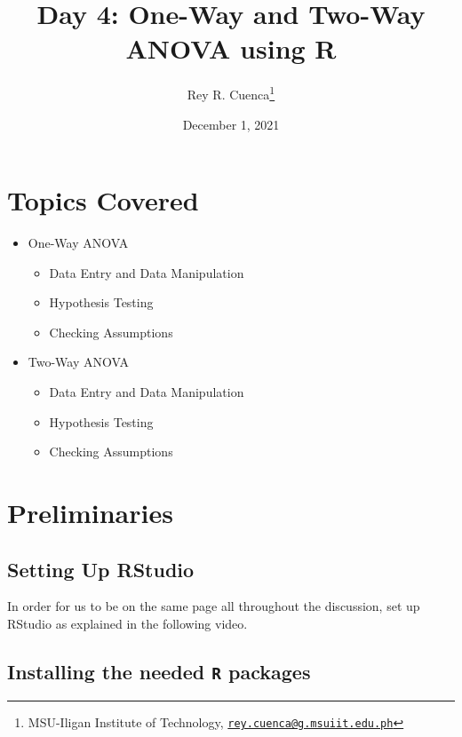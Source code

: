\documentclass[
]{book}
\title{Day 4: One-Way and Two-Way ANOVA using R}
\author{Rey R. Cuenca\footnote{MSU-Iligan Institute of Technology, \href{mailto:rey.cuenca@g.msuiit.edu.ph}{\nolinkurl{rey.cuenca@g.msuiit.edu.ph}}}}
\date{December 1, 2021}
\providecommand{\tightlist}{%
  \setlength{\itemsep}{0pt}\setlength{\parskip}{0pt}}
\begin{document}
\maketitle

{
\setcounter{tocdepth}{1}
\tableofcontents
}
\hypertarget{topics-covered}{%
\chapter*{Topics Covered}\label{topics-covered}}

\begin{itemize}
\tightlist
\item
  One-Way ANOVA

  \begin{itemize}
  \tightlist
  \item
    Data Entry and Data Manipulation
  \item
    Hypothesis Testing
  \item
    Checking Assumptions
  \end{itemize}
\item
  Two-Way ANOVA

  \begin{itemize}
  \tightlist
  \item
    Data Entry and Data Manipulation
  \item
    Hypothesis Testing
  \item
    Checking Assumptions
  \end{itemize}
\end{itemize}

\hypertarget{preliminaries}{%
\chapter{Preliminaries}\label{preliminaries}}

\hypertarget{setting-up-rstudio}{%
\section{Setting Up RStudio}\label{setting-up-rstudio}}

In order for us to be on the same page all throughout the discussion, set up RStudio as explained in the following video.

\hypertarget{installing-the-needed-r-packages}{%
\section{\texorpdfstring{Installing the needed \texttt{R} packages}{Installing the needed R packages}}\label{installing-the-needed-r-packages}}
\end{document}
